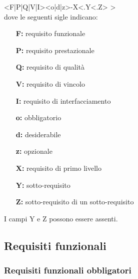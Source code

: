 \documentclass[10pt,a4paper]{article}
\begin{document}
<F|P|Q|V|I><o|d|z>-X<.Y<.Z> >\\

dove le seguenti sigle indicano:
\begin{itemize}
\item[\textbf{F:}] requisito funzionale
\item[\textbf{P:}] requisito prestazionale
\item[\textbf{Q:}] requisito di qualità
\item[\textbf{V:}] requisito di vincolo
\item[\textbf{I:}] requisito di interfacciamento\\
\end{itemize}
\begin{itemize}
\item[\textbf{o:}] obbligatorio
\item[\textbf{d:}] desiderabile
\item[\textbf{z:}] opzionale\\
\end{itemize}
\begin{itemize}
\item[\textbf{X:}] requisito di primo livello
\item[\textbf{Y:}] sotto-requisito
\item[\textbf{Z:}] sotto-requisito di un sotto-requisito\\
\end{itemize}
I campi Y e Z possono essere assenti.

\newpage

\subsection{Requisiti funzionali}

\subsubsection{Requisiti funzionali obbligatori}
\end{document}
